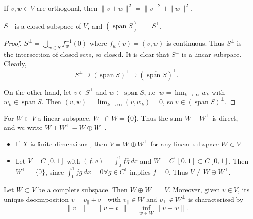 \documentclass{article}
\DeclareMathOperator{\spn}{span}
\begin{document}
\begin{fact}
    If $v, w \in V$ are orthogonal, then $\|v+w\|^2 = \|v\|^2 + \|w\|^2$.
\end{fact}

\begin{fact}
    $S^\perp$ is a closed subspace of $V$, and $(\overline{\spn S})^\perp = S^\perp$.
\end{fact}

\begin{proof}
    $S^\perp = \bigcup_{w \in S} f_w^{-1}(0)$ where $f_w(v) = (v, w)$ is continuous.
    Thus $S^\perp$ is the intersection of closed sets, so closed. It is clear that $S^\perp$ is a linear subspace.
    Clearly,
    \begin{equation*}
        S^\perp \supseteq (\spn S)^\perp \supseteq (\overline{\spn S})^\perp.
    \end{equation*}

    On the other hand, let $v \in S^\perp$ and $w \in \overline{\spn S}$, i.e. $w = \lim_{k \to \infty} w_k$ with $w_k \in \spn S$.
    Then $(v, w) = \lim_{k \to \infty} (v, w_k) = 0$, so $v \in (\spn S)^\perp$.
\end{proof}

For $W \subset V$ a linear subspace, $W^\perp \cap W = \{0\}$. Thus the sum $W + W^\perp$ is direct, and we write $W + W^\perp = W \oplus W^\perp$.

\begin{eg}
    \leavevmode
    \begin{itemize}
        \item If $X$ is finite-dimensional, then $V = W \oplus W^\perp$ for any linear subspace $W \subset V$.
        \item Let $V = C[0,1]$ with $(f,g) = \int_0^1 f \overline{g} \, dx$ and $W = C^1[0,1] \subset C[0,1]$.
            Then $W^\perp = \{0\}$, since $\int_0^1 f \overline{g} \, dx = 0 \forall g \in C^1$ implies $f = 0$. Thus $V \neq W \oplus W^\perp$.
    \end{itemize}
\end{eg}

\begin{thm}
    Let $W \subset V$ be a complete subspace. Then $W \oplus W^\perp = V$.
    Moreover, given $v \in V$, its unique decomposition $v = v_\parallel + v_\perp$ with $v_\parallel \in W$ and $v_\perp \in W^\perp$ is characterised by
    \begin{equation*}
        \|v_\perp\| = \|v - v_\parallel\| = \inf_{w \in W} \|v - w\| \tag{$*$} \label{eq:17star}.
    \end{equation*}
\end{thm}
\end{document}
